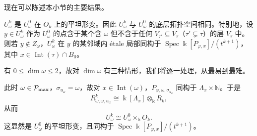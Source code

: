 现在可以陈述本小节的主要结果。

\begin{theorem}
$U^k_\omega$ 是 $U^0_\omega$ 在 $O_k$ 上的平坦形变。因此 $U^k_\omega$ 与 $U^0_\omega$ 的底层拓扑空间相同。特别地，设 $y\in U^k_\omega$ 作为 $U^0_\omega$ 的点含于某个含 $\omega$ 但不含于任何 $V_{\tau'}\subseteq V_\tau$（$\tau'\subsetneq\tau$）的层 $V_\tau$ 中。则若 $y\notin Z_\omega$，$U^k_\omega$ 在 $y$ 的某邻域内 étale 局部同构于 $\operatorname{Spec}\Bbbk[P_{\varphi,x}]/(t^{k+1})$，其中 $x\in\operatorname{Int}(\tau)\cap B_0$。
\end{theorem}

有 $0\le\dim\omega\le2$，故对 $\dim\omega$ 有三种情形，我们将逐一处理，从最易到最难。

此时 $\omega\in\mathcal{P}_{\max}$，$\sigma_{u_\omega}=\omega$，故对 $x\in\operatorname{Int}(\omega)$，$P_{\varphi,\omega,\sigma_{u_\omega}}$ 同构于 $\Lambda_x\times\mathbb{N}$。于是
\[
  R^k_{\omega,\omega,u_\omega}\cong\Bbbk[\Lambda_x]\otimes_\Bbbk R_k,
\]
从而
\[
  U^k_\omega\cong U^0_\omega\times_\Bbbk O_k.
\]
这显然是 $U^0_\omega$ 的平坦形变，且同构于 $\operatorname{Spec}\Bbbk[P_{\varphi,x}]/(t^{k+1})$。

